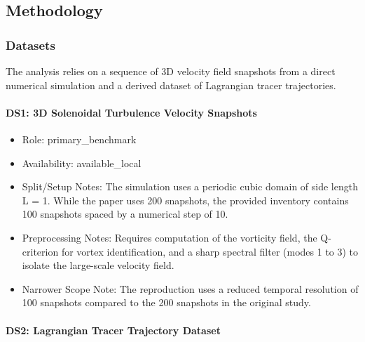 \documentclass[11pt]{article}
\begin{document}
\subsection*{Methodology}

\subsubsection*{Datasets}

The analysis relies on a sequence of 3D velocity field snapshots from a direct numerical simulation and a derived dataset of Lagrangian tracer trajectories.

\paragraph{DS1: 3D Solenoidal Turbulence Velocity Snapshots}

\begin{itemize}

\item Role: primary\_benchmark

\item Availability: available\_local

\item Split/Setup Notes: The simulation uses a periodic cubic domain of side length L = 1. While the paper uses 200 snapshots, the provided inventory contains 100 snapshots spaced by a numerical step of 10.

\item Preprocessing Notes: Requires computation of the vorticity field, the Q-criterion for vortex identification, and a sharp spectral filter (modes 1 to 3) to isolate the large-scale velocity field.

\item Narrower Scope Note: The reproduction uses a reduced temporal resolution of 100 snapshots compared to the 200 snapshots in the original study.

\end{itemize}

\paragraph{DS2: Lagrangian Tracer Trajectory Dataset}
\end{document}

